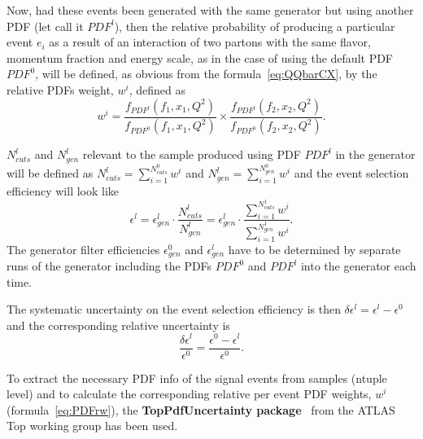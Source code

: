 Now, had these events been generated with the same generator but using another PDF (let call it $PDF^l$), 
then the relative probability of producing a particular event $e_i$ as a result of an interaction of two 
partons with the same flavor, momentum fraction and energy scale, as in the case of using the default PDF 
$PDF^0$, will be defined, as obvious from the formula~\eqref{eq:QQbarCX}, by the relative PDFs weight, 
$w^i$, defined as
% 
\begin{equation}
\label{eq:PDFrw}
w^i=\frac{f_{PDF^l}(f_1,x_1,Q^2)}{f_{PDF^0}(f_1,x_1,Q^2)} \times \frac{f_{PDF^l}(f_2,x_2,Q^2)}{f_{PDF^0}(f_2,x_2,Q^2)}.
\end{equation}
%

$N^l_{cuts}$ and $N^l_{gen}$ relevant to the sample produced using PDF $PDF^l$ in the generator will be 
defined as $N^l_{cuts} = \sum^{N^0_{cuts}}_{i=1}w^i $ and $N^l_{gen} = \sum^{N^0_{gen}}_{i=1}w^i $ and the 
event selection efficiency will look like
%
\[ 
\epsilon^l = \epsilon^l_{gen} \cdot \frac{N^l_{cuts}}{N^l_{gen}} = \epsilon^l_{gen} \cdot \frac{ \sum^{N^1_{cuts}}_{i=1}w^i }{ \sum^{N^1_{gen}}_{i=1}w^i}. 
\]
%
The generator filter efficiencies $\epsilon^0_{gen}$ and $\epsilon^l_{gen}$ have to be determined by separate 
runs of the generator including the PDFs $PDF^0$ and $PDF^l$ into the generator each time. 

The systematic uncertainty on the event selection efficiency is then $\delta \epsilon^l = \epsilon^l-\epsilon^0$ 
and the corresponding relative uncertainty is
%
\begin{equation}
\label{eq:}
\frac{\delta \epsilon^l}{\epsilon^0} =\frac{\epsilon^0 - \epsilon^l}{\epsilon^0}.
\end{equation}
%

To extract the necessary PDF info of the signal events from samples (ntuple level) and to calculate the corresponding 
relative per event PDF weights, $w^i$ (formula~\ref{eq:PDFrw}), the {\bf TopPdfUncertainty 
package}~\cite{TopPdfUncert} from the ATLAS Top working group has been used.


